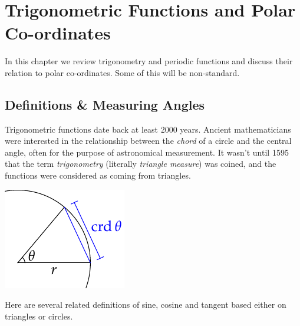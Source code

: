 \graphicspath{{2trig/asy/}}

\section{Trigonometric Functions and Polar Co-ordinates}\label{sec:trig}

In this chapter we review trigonometry and periodic functions and discuss their relation to polar co-ordinates. Some of this will be non-standard.

\subsection{Definitions \& Measuring Angles}\label{ssec:trigdef}

\begin{minipage}[t]{0.74\linewidth}\vspace{-5pt}
	Trigonometric functions date back at least 2000 years. Ancient mathematicians were interested in the relationship between the \emph{chord} of a circle and the central angle, often for the purpose of astronomical measurement. It wasn't until 1595 that the term \emph{trigonometry} (literally \emph{triangle measure}) was coined, and the functions were considered as coming from triangles.
\end{minipage}
\hfill
\begin{minipage}[t]{0.25\linewidth}\vspace{-15pt}
	\flushright
	\includegraphics{defn-chord}
\end{minipage}
\smallbreak

Here are several related definitions of sine, cosine and tangent based either on triangles or circles.



